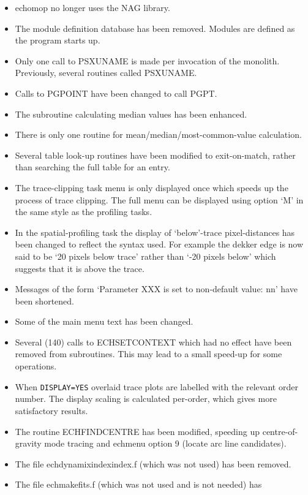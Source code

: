\documentclass[twoside,11pt]{article}
\newcommand{\htmlref}[2]{#1}
\renewcommand{\_}{\texttt{\symbol{95}}}
\begin{document}
\begin{itemize}
\item {\sc echomop} no longer uses the NAG library.
\item The module definition database has been removed.  Modules are defined
   as the program starts up.
\item Only one call to PSX\_UNAME is made per invocation of the monolith.
   Previously, several routines called PSX\_UNAME.
\item Calls to PGPOINT have been changed to call PGPT.
\item The subroutine calculating median values has been enhanced.
\item There is only one routine for mean/median/most-common-value
   calculation.
\item Several table look-up routines have been modified to exit-on-match,
   rather than searching the full table for an entry.
\item The trace-clipping task menu is only displayed once which speeds
   up the process of trace clipping.  The full menu can be displayed
   using option `M' in the same style as the profiling tasks.
\item In the spatial-profiling task the display of `below'-trace
   pixel-distances has been changed to reflect the syntax used.  For
   example the dekker edge is now said to be `20 pixels below trace'
   rather than `-20 pixels below' which suggests that it is above the
   trace.
\item Messages of the form `Parameter XXX is set to non-default value: nn'
   have been shortened.
\item Some of the main menu text has been changed.
\item Several (140) calls to ECH\_SET\_CONTEXT which had no effect have been
   removed from subroutines.  This may lead to a small speed-up for
   some operations.
\item When \htmlref{{\tt{DISPLAY=YES}}}{par_DISPLAY} overlaid trace plots are
   labelled with the relevant
   order number.  The display scaling is calculated per-order, which gives
   more satisfactory results.
\item The routine ECH\_FIND\_CENTRE has been modified, speeding up
   centre-of-gravity mode tracing and echmenu option 9 (locate arc line
   candidates).
\item The file ech\_dynamix\_index\_index.f (which was not used) has been
   removed.
\item The file ech\_makefits.f (which was not used and is not needed) has

\end{itemize}
\end{document}
